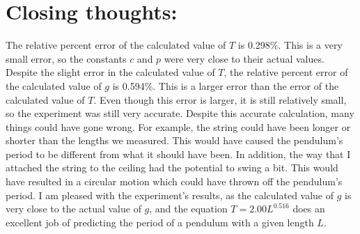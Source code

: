 \documentclass[12pt]{extarticle}
\begin{document}
\section{Closing thoughts:}
The relative percent error of the calculated value of $T$ is 0.298\%. This is a very small error, so the constants $c$ and $p$ were very close to their actual values.
Despite the slight error in the calculated value of $T$, the relative percent error of the calculated value of $g$ is 0.594\%. This is a larger error than the error of the calculated value of $T$.
Even though this error is larger, it is still relatively small, so the experiment was still very accurate.
Despite this accurate calculation, many things could have gone wrong. For example, the string could have been longer or shorter than the lengths we measured.
This would have caused the pendulum's period to be different from what it should have been. In addition, the way that I attached the string to the ceiling had the potential to swing a bit.
This would have resulted in a circular motion which could have thrown off the pendulum's period.
I am pleased with the experiment's results, as the calculated value of $g$ is very close to the actual value of $g$, and the equation $T = 2.00L^{0.516}$ does an excellent job of predicting the period of a pendulum with a given length $L$.
\end{document}
